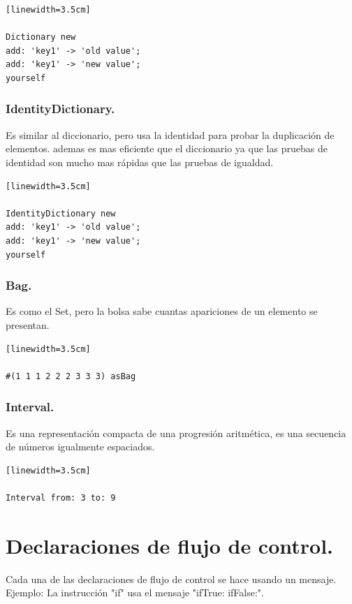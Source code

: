 \documentclass[10pt,journal,compsoc]{IEEEtran}
\begin{document}
\begin{lstlisting}[language=Smalltalk, caption = {Ejemplo para actualizar diccionario.}][linewidth=3.5cm]

Dictionary new
add: 'key1' -> 'old value';
add: 'key1' -> 'new value';
yourself

\end{lstlisting}

\subsubsection{IdentityDictionary.}
Es similar al diccionario, pero usa la identidad para probar la duplicaci\'on de elementos. ademas es mas eficiente que el diccionario ya que las pruebas de identidad son mucho mas r\'apidas que las pruebas de igualdad. 
\begin{lstlisting}[language=Smalltalk, caption = {Ejemplo con 2 entradas en la misma llave.}][linewidth=3.5cm]

IdentityDictionary new
add: 'key1' -> 'old value';
add: 'key1' -> 'new value';
yourself 

\end{lstlisting}

\subsubsection{Bag.}
Es como el Set, pero la bolsa sabe cuantas apariciones de un elemento se presentan.
\begin{lstlisting}[language=Smalltalk, caption = {Ejemplo de Bag.}][linewidth=3.5cm]

#(1 1 1 2 2 2 3 3 3) asBag

\end{lstlisting}

\subsubsection{Interval.}
Es una representaci\'on compacta de una progresi\'on aritm\'etica, es una secuencia de n\'umeros igualmente espaciados.
\begin{lstlisting}[language=Smalltalk, caption = {Representa una secuencia 3, 4, 5, 6, 7, 8, 9.}][linewidth=3.5cm]

Interval from: 3 to: 9

\end{lstlisting}

\section{Declaraciones de flujo de control.}
Cada una de las declaraciones de flujo de control se hace usando un mensaje. Ejemplo: La instrucci\'on "if" usa el mensaje "ifTrue: ifFalse:".
\end{document}
